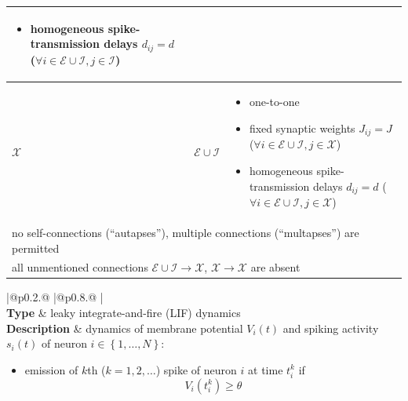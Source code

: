 \documentclass[10pt,a4paper,twoside,american]{article}
\newcommand{\Epop}{\mathcal{E}} %
\newcommand{\Ipop}{\mathcal{I}} %
\newcommand{\Xpop}{\mathcal{X}} %
\begin{document}
\begin{table}[H]
\begin{tabular}{
  |@{\hspace*{\marg}}p{}@{\hspace*{\marg}}
  |@{\hspace*{\marg}}p{}@{\hspace*{\marg}}
  |@{\hspace*{\marg}}p{}@{\hspace*{\marg}}
  |}
\begin{itemize}[align=left,leftmargin=*]
                      \item homogeneous spike-transmission delays $d_{ij}=d$ ($\forall{}i\in\Epop\cup\Ipop, j\in\Ipop$)
                      \end{itemize}\\
  \hline 
  $\Xpop$ & $\Epop\cup\Ipop$ & %
                      \begin{itemize}[align=left,leftmargin=*]
                      \item one-to-one
                      \item fixed synaptic weights $J_{ij}=J$ ($\forall{}i\in\Epop\cup\Ipop, j\in\Xpop$)                        
                      \item homogeneous spike-transmission delays $d_{ij}=d$ ($\forall{}i\in\Epop\cup\Ipop, j\in\Xpop$)
                      \end{itemize}\\
  \hline
\multicolumn{3}{|l|}{no self-connections (``autapses''), multiple connections (``multapses'') are permitted}\\
\hline
  \multicolumn{3}{|l|}{all unmentioned connections
  $\Epop\cup\Ipop\to\Xpop$, $\Xpop\to\Xpop$
  are absent}\\
  \hline
\end{tabular}
\begin{tabular}{
  |@{\hspace*{\marg}}p{}@{\hspace*{\marg}}
  |@{\hspace*{\marg}}p{}@{\hspace*{\marg}}
  |}
  \hline 
  \\
  \hline 
  \textbf{Type} & leaky integrate-and-fire (LIF) dynamics\\
  \hline 
  \textbf{Description} & dynamics of membrane potential $V_{i}(t)$ and spiking activity $s_i(t)$ of neuron $i\in\left\{1,\ldots,N\right\} $:
                         \begin{itemize}
                         \item emission of $k$th ($k=1,2,\ldots$) spike of neuron $i$ at time $t_{i}^{k}$ if
                           \begin{equation*}
                             V_{i}\left(t_{i}^{k}\right)\geq\theta  

\end{equation*}
\end{itemize}
\end{tabular}
\end{table}
\end{document}
